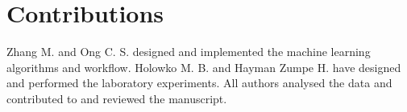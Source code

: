 \documentclass{article}
\begin{document}


\section{Contributions}
Zhang M. and Ong C. S. designed and implemented the machine learning algorithms and workflow. Holowko M. B. and Hayman Zumpe H. have designed and performed the laboratory experiments. All authors analysed the data and contributed to and reviewed the manuscript.


\newpage

\printbibliography

\clearpage

\appendix

\end{document}
